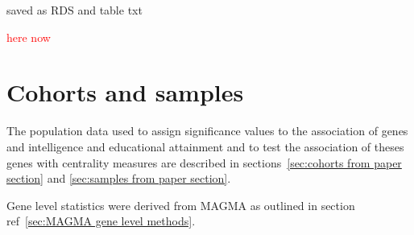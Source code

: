 








saved as RDS and table txt

\textcolor{red}{here now}




\section{Cohorts and samples}
\label{Centrality:cohorts and samples}
The population data used to assign significance values to the association of genes and intelligence and educational attainment and to test the association of theses genes with centrality measures are described in sections~\ref{sec:cohorts from paper section} and \ref{sec:samples from paper section}.

Gene level statistics were derived from MAGMA as outlined in section ref~\ref{sec:MAGMA gene level methods}.











